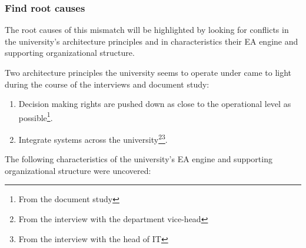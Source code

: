 \subsubsection*{Find root causes}

The root causes of this mismatch will be highlighted by looking for conflicts in the university's architecture principles and in characteristics their EA engine and supporting organizational structure. 

Two architecture principles the university seems to operate under came to light during the course of the interviews and document study:

\begin{enumerate}
\item Decision making rights are pushed down as close to the operational level as possible\footnote{From the document study\label{fn:document}}.
\item Integrate systems across the university\footnote{From the interview with the department vice-head\label{fn:interviewHead}}\footnote{From the interview with the head of IT\label{fn:interviewIT}}.
\end{enumerate}

The following characteristics of the university's EA engine and supporting organizational structure were uncovered: 

